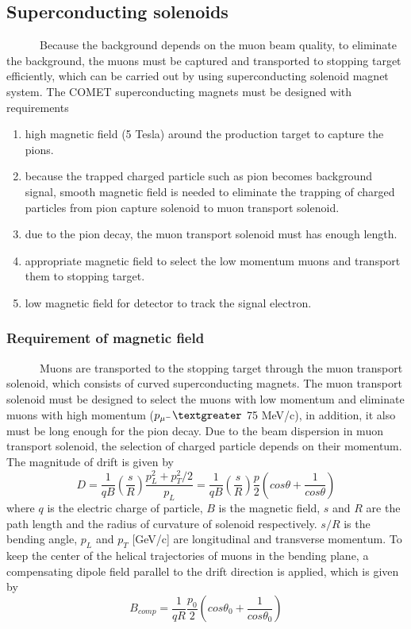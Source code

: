 \subsection{Superconducting solenoids}
~~~~~~Because the background depends on the muon beam quality, to eliminate the background, the muons must be captured and transported to stopping target efficiently, which can be carried out by using superconducting solenoid magnet system.
The COMET superconducting magnets must be designed with requirements
\begin{enumerate}
 \setlength{\itemsep}{-5pt} 
 \item high magnetic field (5 Tesla) around the production target to capture the pions.
 \item because the trapped charged particle such as pion becomes background signal, smooth magnetic field is needed to eliminate the trapping of charged particles from pion capture solenoid to muon transport solenoid.
 \item due to the pion decay, the muon transport solenoid must has enough length.
 \item appropriate magnetic field to select the low momentum muons and transport them to stopping target.
 \item low magnetic field for detector to track the signal electron.
\end{enumerate}

\subsubsection{Requirement of magnetic field}
~~~~~~Muons are transported to the stopping target through the muon transport solenoid, which consists of curved superconducting magnets.
The muon transport solenoid must be designed to select the muons with low momentum and eliminate muons with high momentum ($p_{\mu^-} \textgreater$ 75 MeV/c), in addition, it also must be long enough for the pion decay.
Due to the beam dispersion in muon transport solenoid, the selection of charged particle depends on their momentum.
The magnitude of drift is given by
\begin{equation}
 D = \frac{1}{qB}(\frac{s}{R})\frac{p_L^2 + p_T^2/2}{p_L} = \frac{1}{qB}(\frac{s}{R})\frac{p}{2}(cos\theta + \frac{1}{cos\theta})
\end{equation}
where $q$ is the electric charge of particle, $B$ is the magnetic field, $s$ and $R$ are the path length and the radius of curvature of solenoid respectively.
$s/R$ is the bending angle, $p_L$ and $p_T$ [GeV/c] are longitudinal and transverse momentum.
To keep the center of the helical trajectories of muons in the bending plane, a compensating dipole field parallel to the drift direction is applied, which is given by
\begin{equation}
 B_{comp} = \frac{1}{qR} \frac{p_0}{2} (cos\theta_0 + \frac{1}{cos\theta_0})
\end{equation}

